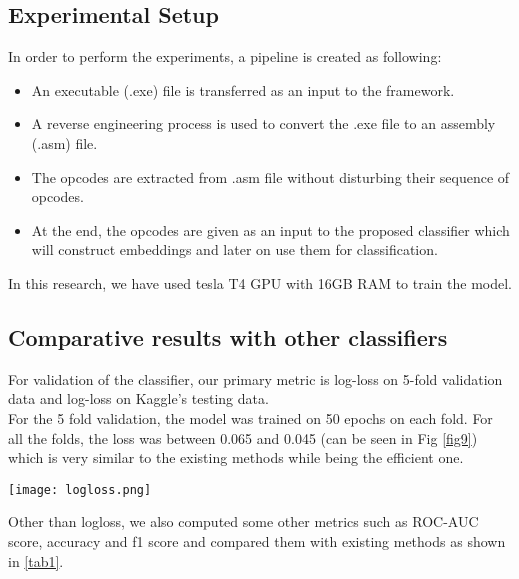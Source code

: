 \documentclass[conference]{IEEEtran}
\begin{document}
\subsection{Experimental Setup}
In order to perform the experiments, a pipeline is created as following:
\begin{itemize}
    \item An executable (.exe) file is transferred as an input to the framework.
    \item A reverse engineering process is used to convert the .exe file to an assembly (.asm) file.
    \item The opcodes are extracted from .asm file without disturbing their sequence of opcodes.
    \item At the end, the opcodes are given as an input to the proposed classifier which will construct embeddings and later on use them for classification.
\end{itemize}
In this research, we have used tesla T4 GPU with 16GB RAM to train the model. 
\subsection{Comparative results with other classifiers}
For validation of the classifier, our primary metric is log-loss on 5-fold validation data and log-loss on Kaggle’s testing data.\\
For the 5 fold validation, the model was trained on 50 epochs on each fold. For all the folds, the loss was between 0.065 and 0.045 (can be seen in Fig \ref{fig9}) which is very similar to the existing methods while being the efficient one.

\begin{figure*}
\centerline{\texttt{[image: logloss.png]}}
\caption{Logloss on 5-fold validation.}
\label{fig9}
\end{figure*}
Other than logloss, we also computed some other metrics such as ROC-AUC score, accuracy and f1 score and compared them with existing methods as shown in \ref{tab1}.
\end{document}
